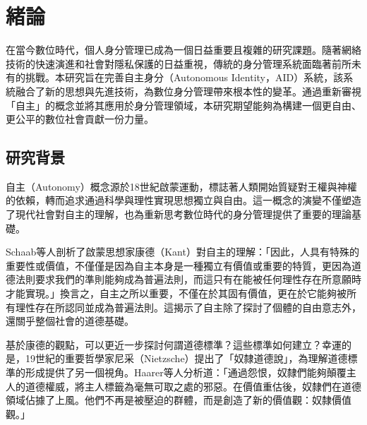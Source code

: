 
\chapter{緒論}
在當今數位時代，個人身分管理已成為一個日益重要且複雜的研究課題。隨著網絡技術的快速演進和社會對隱私保護的日益重視，傳統的身分管理系統面臨著前所未有的挑戰。本研究旨在完善自主身分（Autonomous Identity，AID）系統，該系統融合了新的思想與先進技術，為數位身分管理帶來根本性的變革。通過重新審視「自主」的概念並將其應用於身分管理領域，本研究期望能夠為構建一個更自由、更公平的數位社會貢獻一份力量。
\section{研究背景}
自主（Autonomy）概念源於18世紀啟蒙運動，標誌著人類開始質疑對王權與神權的依賴，轉而追求通過科學與理性實現思想獨立與自由。這一概念的演變不僅塑造了現代社會對自主的理解，也為重新思考數位時代的身分管理提供了重要的理論基礎。

Schaab等人\cite{Schaab2022}剖析了啟蒙思想家康德（Kant）對自主的理解：「因此，人具有特殊的重要性或價值，不僅僅是因為自主本身是一種獨立有價值或重要的特質，更因為道德法則要求我們的準則能夠成為普遍法則，而這只有在能被任何理性存在所意願時才能實現。」換言之，自主之所以重要，不僅在於其固有價值，更在於它能夠被所有理性存在所認同並成為普遍法則。這揭示了自主除了探討了個體的自由意志外，還關乎整個社會的道德基礎。

基於康德的觀點，可以更近一步探討何謂道德標準？這些標準如何建立？幸運的是，19世紀的重要哲學家尼采（Nietzsche）提出了「奴隸道德說」，為理解道德標準的形成提供了另一個視角。Haarer等人\cite{haarer2020nietzsche}分析道：「通過怨恨，奴隸們能夠顛覆主人的道德權威，將主人標籤為毫無可取之處的邪惡。在價值重估後，奴隸們在道德領域佔據了上風。他們不再是被壓迫的群體，而是創造了新的價值觀：奴隸價值觀。」

